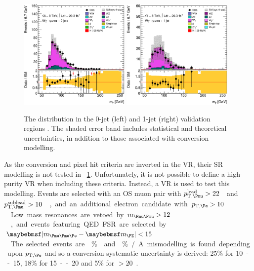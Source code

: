 \begin{figure}[t]
	\includegraphics[width=0.48\textwidth]{tex/backgrounds/Wgamma/CutTopoDPhill_0jet_MT_TrackHWW_Clj_mh125_lin}
	\hfill
	\includegraphics[width=0.48\textwidth]{tex/backgrounds/Wgamma/CutTopoDPhill_1jet_MT_TrackHWW_Clj_mh125_lin}
	\caption{The \mt distribution in the 0-jet (left) and 1-jet (right) \Wgamma validation 
	regions \cite{BackgroundNote}. The shaded error band includes statistical and 
	theoretical uncertainties, in addition to those associated with conversion modelling.}
	\label{fig:wgamma:vr}
\end{figure}

As the conversion and pixel hit criteria are inverted in the VR, their SR modelling is not 
tested in \Figure~\ref{fig:wgamma:vr}. Unfortunately, it is not possible to define a 
high-purity \Wgamma VR when including these criteria. Instead, 
a \HepProcess{\Zgamma \HepTo \Pmu\Pmu\Pphoton} VR is used to test this modelling. 
Events are selected with an OS muon pair with \unit{$p_{\text{T,\Pmu}}^{\text{lead}} > 
22$}{\GeV} and \unit{$p_{\text{T,\Pmu}}^{\text{sublead}} > 10$}{\GeV}, and an additional 
electron candidate with \unit{$p_{\text{T,\Pe}} > 10$}{\GeV}. Low mass resonances are vetoed 
by \unit{$m_{\HepProcess{\Pmu\Pmu}} > 12$}{\GeV}, and events featuring QED FSR are selected 
by \unit{$\mods{m_{\HepProcess{\Pmu\Pmu\Pe}} - \mZ} < 15$}{\GeV}. The selected events are 
\% \Zgamma and \% \WZ/\Zgstar. A mismodelling is found depending upon 
$p_{\text{T,\Pe}}$ and so a conversion systematic uncertainty is derived: 25\% for 
\unit{10 -- 15}{\GeV}, 18\% for \unit{15 -- 20}{\GeV} and 5\% for \unit{$>\!20$}{\GeV}.



